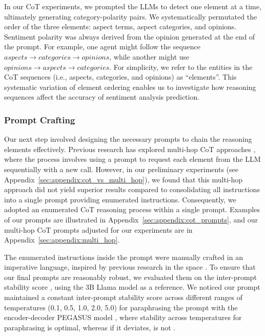 \documentclass[11pt]{article}
\begin{document}
In our CoT experiments, we prompted the LLMs to detect one element at a time, ultimately generating category-polarity pairs. We systematically permutated the order of the three elements: aspect terms, aspect categories, and opinions. Sentiment polarity was always derived from the opinion generated at the end of the prompt. For example, one agent might follow the sequence $aspects \rightarrow categories \rightarrow opinions$, while another might use $opinions \rightarrow aspects \rightarrow categories$. For simplicity, we refer to the entities in the CoT sequences (i.e., aspects, categories, and opinions) as ``elements''. This systematic variation of element ordering enables us to investigate how reasoning sequences affect the accuracy of sentiment analysis prediction.



\subsubsection{Prompt Crafting}
Our next step involved designing the necessary prompts to chain the reasoning elements effectively. Previous research has explored multi-hop CoT approaches \citet{fei-etal-2023-reasoning,10499502}, where the process involves using a prompt to request each element from the LLM sequentially with a new call. However, in our preliminary experiments (see Appendix~\ref{sec:appendix:cot_vs_multi_hop}), we found that this multi-hop approach did not yield superior results compared to consolidating all instructions into a single prompt providing enumerated instructions. Consequently, we adopted an enumerated CoT reasoning process within a single prompt. Examples of our prompts are illustrated in Appendix~\ref{sec:appendix:cot_prompts}, and our multi-hop CoT prompts adjusted for our experiments are in Appendix~\ref{sec:appendix:multi_hop}.

The enumerated instructions inside the prompt were manually crafted in an imperative language, inspired by previous research in the space \citep{fei-etal-2023-reasoning,10499502,bai-etal-2024-compound}. To ensure that our final prompts are reasonably robust, we evaluated them on the inter-prompt stability score \citep{promptstability}, using the 3B Llama model as a reference.  We noticed our prompt maintained a constant inter-prompt stability score across different ranges of temperatures (0.1, 0.5, 1.0, 2.0, 5.0) for paraphrasing the prompt with the encoder-decoder PEGASUS model \citep{pegasus}, where stability across temperatures for paraphrasing is optimal, whereas if it deviates, is not \citep{promptstability}.
\end{document}
